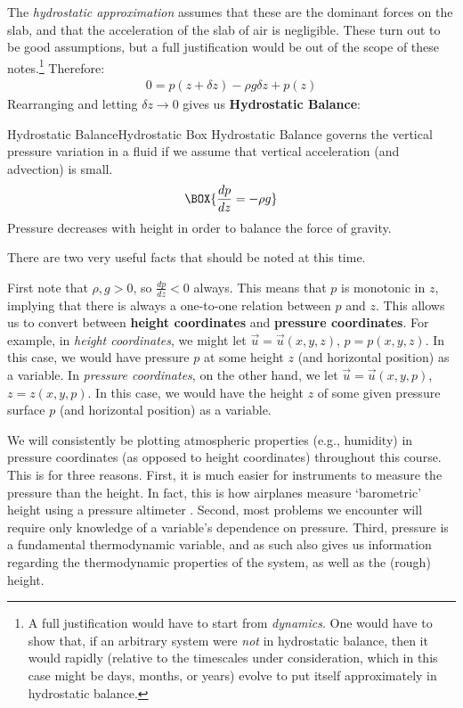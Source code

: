 The \textit{hydrostatic approximation} assumes that these are the dominant forces on the slab, and that the acceleration of the slab of air is negligible. These turn out to be good assumptions, but a full justification would be out of the scope of these notes.\footnote{
    A full justification would have to start from \textit{dynamics}. One would have to show that, if an arbitrary system were \textit{not} in hydrostatic balance, then it would rapidly (relative to the timescales under consideration, which in this case might be days, months, or years) evolve to put itself approximately in hydrostatic balance.
} Therefore:
\begin{align*}
    0=p(z+\delta z)-\rho g\delta z+p(z)
\end{align*}
Rearranging and letting $\delta z\to0$ gives us \textbf{Hydrostatic Balance}:
\begin{fact}{Hydrostatic Balance}{Hydrostatic Box}\label{Hydrostatic Box}
Hydrostatic Balance governs the vertical pressure variation in a fluid if we assume that vertical acceleration (and advection) is small.
    \begin{equation}\label{Hydrostatic Balance}
    \BOX{
        \frac{dp}{dz}=-\rho g
    }
    \end{equation}
Pressure decreases with height in order to balance the force of gravity.
\end{fact}
\noindent There are two very useful facts that should be noted at this time. 

First note that $\rho,g>0$, so $\frac{dp}{dz}<0$ always. This means that $p$ is monotonic in $z$, implying that there is always a one-to-one relation between $p$ and $z$. This allows us to convert between \textbf{height coordinates} and \textbf{pressure coordinates}. For example, in \textit{height coordinates}, we might let $\vec{u}=\vec{u}(x,y,z)$, $p=p(x,y,z)$. In this case, we would have pressure $p$ at some height $z$ (and horizontal position) as  a variable. In \textit{pressure coordinates}, on the other hand, we let $\vec{u}=\vec{u}(x,y,p)$, $z=z(x,y,p)$. In this case, we would have the height $z$ of some given pressure surface $p$ (and horizontal position) as a variable.

We will consistently be plotting atmospheric properties (e.g., humidity) in pressure coordinates (as opposed to height coordinates) throughout this course. This is for three reasons. First, it is much easier for instruments to measure the pressure than the height. In fact, this is how airplanes measure `barometric' height using a pressure altimeter \cite{Altimeter}. Second, most problems we encounter will require only knowledge of a variable's dependence on pressure. Third, pressure is a fundamental thermodynamic variable, and as such also gives us information regarding the thermodynamic properties of the system, as well as the (rough) height.

